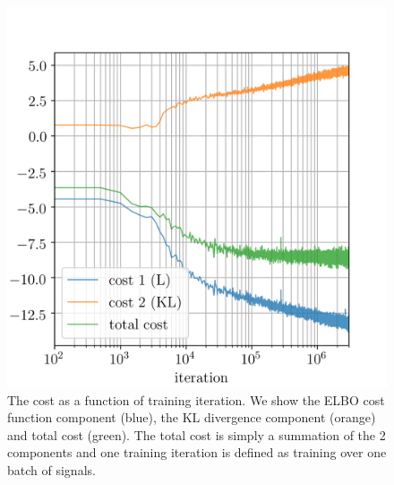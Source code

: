 \documentclass[%
showpacs,
 amsmath,amssymb,
 aps,
 twocolumn,
 prl,
 reprint,
floatfix,
]{revtex4-1}
\begin{document}
%
%
\begin{figure}
    \includegraphics[width=\columnwidth]{images/inv_losses_log.png}
\caption{\label{fig:loss_log} The cost as a function of training iteration. We
show the \ac{ELBO} cost function component (blue), the \ac{KL} divergence
component (orange) and total cost (green). The total cost is simply a
summation of the 2 components and one training iteration is defined as
training over one batch of signals.}
\end{figure}
\end{document}
